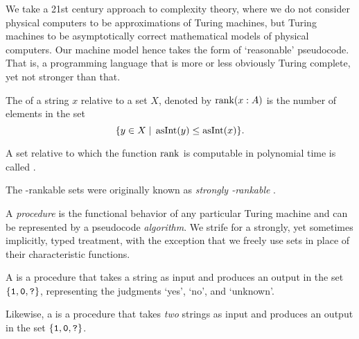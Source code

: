 We take a 21st century approach to complexity theory, where we do not consider physical computers to be approximations of Turing machines, but Turing machines to be asymptotically correct mathematical models of physical computers.
Our machine model hence takes the form of `reasonable' pseudocode.
That is, a programming language that is more or less obviously Turing complete, yet not stronger than that.

\begin{definition}
  The  of a string $x$ relative to a set $X$, denoted by $\operatorname{rank}(x : A)$ is the number of elements in the set
  \begin{equation*}
    \{y \in X \;{|}\; \operatorname{asInt}(y) \le \operatorname{asInt}(x)\}.
  \end{equation*}

  A set relative to which the function $\operatorname{rank}$ is computable in polynomial time is called .
\end{definition}
The \slp-rankable sets were originally known as \emph{strongly -rankable} \parencite{goldberg1991compression}.

A \emph{procedure} is the functional behavior of any particular Turing machine and can be represented by a pseudocode \emph{algorithm}.
We strife for a strongly, yet sometimes implicitly, typed treatment, with the exception that we freely use sets in place of their characteristic functions.
\begin{definition}
  A  is a procedure that takes a string as input and produces an output in the set $\{\textnormal{\texttt{1}}, \textnormal{\texttt{0}}, \textnormal{\texttt{?}}\}$, representing the judgments `yes', `no', and `unknown'.

  Likewise, a  is a procedure that takes \emph{two} strings as input and produces an output in the set $\{\textnormal{\texttt{1}}, \textnormal{\texttt{0}}, \textnormal{\texttt{?}}\}$.
\end{definition}

